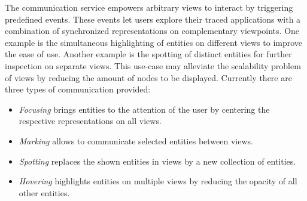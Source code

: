 The communication service empowers arbitrary views to interact by triggering
predefined events. These events let users explore their traced applications
with a combination of synchronized representations on complementary viewpoints.
One example is the simultaneous highlighting of entities on different views to
improve the ease of use. Another example is the spotting of distinct entities
for further inspection on separate views. This use-case may alleviate the
scalability problem of views by reducing the amount of nodes to be displayed.
Currently there are three types of communication provided:

\begin{itemize}
	\item \textit{Focusing} brings entities to the attention of the user by
centering the respective representations on all views.
	\item \textit{Marking} allows to communicate selected entities between views.
	\item \textit{Spotting} replaces the shown entities in views by a new
collection of entities.
	\item \textit{Hovering} highlights entities on multiple views by reducing the
opacity of all other entities.
\end{itemize}